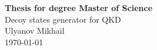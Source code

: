 \begin{titlepage}


\begin{flushleft}
  \textbf{Thesis for degree Master of Science}\\
  {\Large Decoy states generator for QKD\\
          Ulyanov Mikhail}\\
  \today
\end{flushleft}


\end{titlepage}
